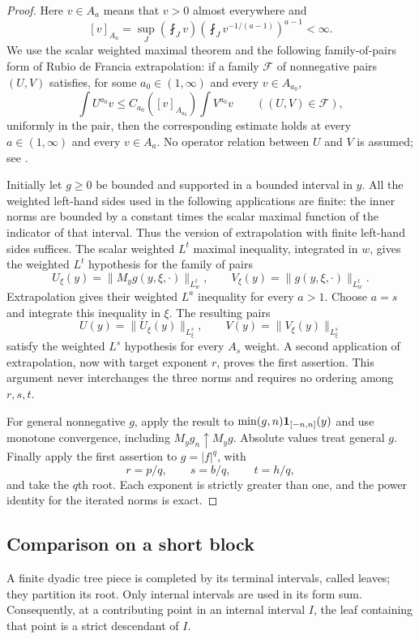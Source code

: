 \begin{proof}
Here $v\in A_a$ means that $v>0$ almost everywhere and
\[
 [v]_{A_a}
 =\sup_J\left(\fint_Jv\right)
            \left(\fint_Jv^{-1/(a-1)}\right)^{a-1}<\infty.
\]
We use the scalar weighted maximal theorem and the following
family-of-pairs form of Rubio de Francia extrapolation: if a family
$\mathcal F$ of nonnegative pairs $(U,V)$ satisfies, for some
$a_0\in(1,\infty)$ and every $v\in A_{a_0}$,
\[
 \int U^{a_0}v
 \le C_{a_0}([v]_{A_{a_0}})\int V^{a_0}v
 \qquad ((U,V)\in\mathcal F),
\]
uniformly in the pair, then the corresponding estimate holds at every
$a\in(1,\infty)$ and every $v\in A_a$.  No operator relation between
$U$ and $V$ is assumed; see
\cite[Theorem~3.9]{CUMP2011}.

Initially let $g\geq0$ be bounded and supported in a bounded interval
in $y$.  All the weighted left-hand sides used in the following
applications are finite: the inner norms are bounded by a constant
times the scalar maximal function of the indicator of that interval.
Thus the version of extrapolation with finite left-hand sides suffices.
The scalar weighted $L^t$ maximal inequality, integrated in $w$, gives
the weighted $L^t$ hypothesis for the family of pairs
\[
 U_\xi(y)=\|M_y g(y,\xi,\cdot)\|_{L_w^t},
 \qquad
 V_\xi(y)=\|g(y,\xi,\cdot)\|_{L_w^t}.
\]
Extrapolation gives their weighted $L^a$ inequality for every $a>1$.
Choose $a=s$ and integrate this inequality in $\xi$.  The resulting
pairs
\[
 U(y)=\|U_\xi(y)\|_{L_\xi^s},\qquad
 V(y)=\|V_\xi(y)\|_{L_\xi^s}
\]
satisfy the weighted $L^s$ hypothesis for every $A_s$ weight.  A second
application of extrapolation, now with target exponent $r$, proves the
first assertion.  This argument never interchanges the three norms and
requires no ordering among $r,s,t$.

For general nonnegative $g$, apply the result to
$\min(g,n)\mathbf 1_{[-n,n]}(y)$ and use monotone convergence, including
$M_y g_n\uparrow M_y g$.  Absolute values treat general $g$.
Finally apply the first assertion to $g=|f|^q$, with
\[
 r=p/q,\qquad s=b/q,\qquad t=h/q,
\]
and take the $q$th root.  Each exponent is strictly greater than one,
and the power identity for the iterated norms is exact.
\end{proof}

\subsection{Comparison on a short block}

A finite dyadic tree piece is completed by its terminal intervals,
called leaves; they partition its root.  Only internal intervals are
used in its form sum.  Consequently, at a contributing point in an
internal interval $I$, the leaf containing that point is a strict
descendant of $I$.

